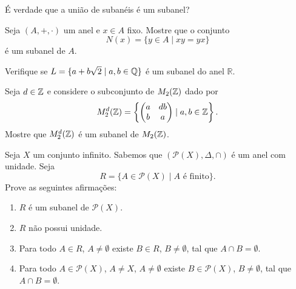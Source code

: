 \documentclass[12pt]{exam}
\begin{document}
    \vspace{.3cm}

    \questao{} \'E verdade que a uni\~ao de suban\'eis \'e um subanel?

    \vspace{.3cm}

    \questao{} Seja $(A, + , \cdot)$ um anel e $x \in A$ fixo. Mostre que o conjunto
    \[
        N(x) = \{y \in A \mid xy = yx\}
    \]
    \'e um subanel de $A$.

    \vspace{.3cm}

    \questao{} Verifique se $L = \{ a + b\sqrt{2} \mid a, b \in \mathbb{Q}\}$ {\'e} um subanel
    do anel $\mathbb{R}$.

    \vspace{.3cm}

    \questao{} Seja $d \in \mathbb{Z}$ e considere o subconjunto de $M_2(\mathbb{Z})$ dado por
    \[
        M_2^d(\mathbb{Z}) = \left\{\begin{pmatrix} a & db \\ b & a \end{pmatrix} \mid a, b \in \mathbb{Z}\right\}.
    \]
    Mostre que $M_2^d(\mathbb{Z})$ é um subanel de $M_2(\mathbb{Z})$.

    \vspace{.3cm}

    \questao{} Seja $X$ um conjunto infinito. Sabemos que $(\mathcal{P}(X), \Delta, \cap)$ é um anel com unidade. Seja
    \[
        R = \{A \in \mathcal{P}(X) \mid A \mbox{ é finito}\}.
    \]
    Prove as seguintes afirmações:
    \begin{enumerate}[label=({\alph*})]
        \item $R$ é um subanel de $\mathcal{P}(X)$.

        \item $R$ não possui unidade.

        \item Para todo $A \in R$, $A \ne \emptyset$ existe $B \in R$, $B \ne \emptyset$, tal que $A \cap B = \emptyset$.

        \item Para todo $A \in \mathcal{P}(X)$, $A \ne X$, $A \ne \emptyset$ existe $B \in \mathcal{P}(X)$, $B \ne \emptyset$, tal que $A \cap B = \emptyset$.
    \end{enumerate}
\end{document}
